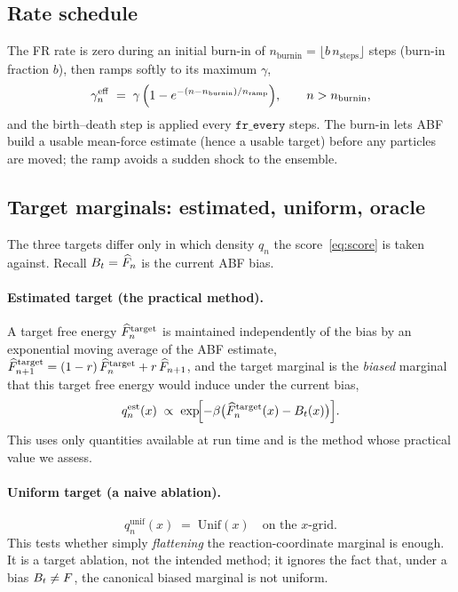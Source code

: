 \subsection{Rate schedule}
\label{sec:schedule}
The FR rate is zero during an initial burn-in of $n_{\mathrm{burnin}}=
\lfloor b\,n_{\mathrm{steps}}\rfloor$ steps (burn-in fraction $b$), then ramps
softly to its maximum $\gamma$,
\begin{equation}
  \gamma_n^{\mathrm{eff}} \;=\;
  \gamma\,\Bigl(1-e^{-(n-n_{\mathrm{burnin}})/n_{\mathrm{ramp}}}\Bigr),
  \qquad n>n_{\mathrm{burnin}},
  \label{eq:ramp}
\end{equation}
and the birth--death step is applied every $\texttt{fr\_every}$ steps. The
burn-in lets ABF build a usable mean-force estimate (hence a usable target)
before any particles are moved; the ramp avoids a sudden shock to the ensemble.

\subsection{Target marginals: estimated, uniform, oracle}
\label{sec:targets}
The three targets differ only in which density $q_n$ the score~\eqref{eq:score}
is taken against. Recall $B_t=\widehat{F}_n$ is the current ABF bias.

\paragraph{Estimated target (the practical method).}
A target free energy $\widehat{F}_n^{\mathrm{target}}$ is maintained independently of
the bias by an exponential moving average of the ABF estimate,
$\widehat{F}_{n+1}^{\mathrm{target}}=(1-r)\,\widehat{F}_n^{\mathrm{target}}+r\,\widehat{F}_{n+1}$,
and the target marginal is the \emph{biased} marginal that this target free
energy would induce under the current bias,
\begin{equation}
  q_n^{\mathrm{est}}(x) \;\propto\;
  \exp\!\Bigl[-\beta\bigl(\widehat{F}_n^{\mathrm{target}}(x)-B_t(x)\bigr)\Bigr].
  \label{eq:q_est}
\end{equation}
This uses only quantities available at run time and is the method whose
practical value we assess.

\paragraph{Uniform target (a naive ablation).}
\begin{equation}
  q_n^{\mathrm{unif}}(x) \;=\; \mathrm{Unif}(x)\quad\text{on the $x$-grid.}
  \label{eq:q_unif}
\end{equation}
This tests whether simply \emph{flattening} the reaction-coordinate marginal is
enough. It is a target ablation, not the intended method; it ignores the fact
that, under a bias $B_t\neq F$, the canonical biased marginal is not uniform.

